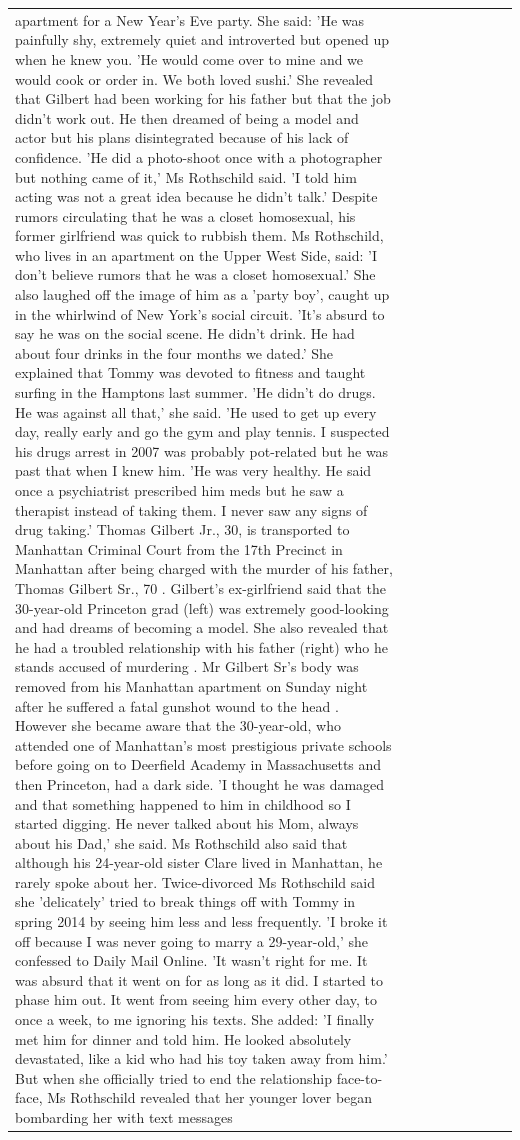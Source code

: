 \begin{table}[H]
\begin{tabular}{lllrlllll}
apartment for a New Year’s Eve party. She said: 'He was painfully shy, extremely quiet and introverted but opened up when he knew you. 'He would come over to mine and we would cook or order in. We both loved sushi.' She revealed that Gilbert had been working for his father but that the job didn't work out. He then dreamed of being a model and actor but his plans disintegrated because of his lack of confidence. 'He did a photo-shoot once with a photographer but nothing came of it,' Ms Rothschild said. 'I told him acting was not a great idea because he didn’t talk.' Despite rumors circulating that he was a closet homosexual, his former girlfriend was quick to rubbish them. Ms Rothschild, who lives in an apartment on the Upper West Side, said: 'I don’t believe rumors that he was a closet homosexual.' She also laughed off the image of him as a 'party boy', caught up in the whirlwind of New York's social circuit. 'It’s absurd to say he was on the social scene. He didn’t drink. He had about four drinks in the four months we dated.' She explained that Tommy was devoted to fitness and taught surfing in the Hamptons last summer. 'He didn’t do drugs. He was against all that,' she said. 'He used to get up every day, really early and go the gym and play tennis. I suspected his drugs arrest in 2007 was probably pot-related but he was past that when I knew him. 'He was very healthy. He said once a psychiatrist prescribed him meds but he saw a therapist instead of taking them. I never saw any signs of drug taking.' Thomas Gilbert Jr., 30, is transported to Manhattan Criminal Court from the 17th Precinct in Manhattan after being charged with the murder of his father, Thomas Gilbert Sr., 70 . Gilbert's ex-girlfriend said that the 30-year-old Princeton grad (left) was extremely good-looking and had dreams of becoming a model. She also revealed that he had a troubled relationship with his father (right) who he stands accused of murdering . Mr Gilbert Sr's body was removed from his Manhattan apartment on Sunday night after he suffered a fatal gunshot wound to the head . However she became aware that the 30-year-old, who attended one of Manhattan's most prestigious private schools before going on to Deerfield Academy in Massachusetts and then Princeton, had a dark side. 'I thought he was damaged and that something happened to him in childhood so I started digging. He never talked about his Mom, always about his Dad,' she said. Ms Rothschild also said that although his 24-year-old sister Clare lived in Manhattan, he rarely spoke about her. Twice-divorced Ms Rothschild said she 'delicately' tried to break things off with Tommy in spring 2014 by seeing him less and less frequently. 'I broke it off because I was never going to marry a 29-year-old,' she confessed to Daily Mail Online. 'It wasn’t right for me. It was absurd that it went on for as long as it did. I started to phase him out. It went from seeing him every other day, to once a week, to me ignoring his texts. She added: 'I finally met him for dinner and told him. He looked absolutely devastated, like a kid who had his toy taken away from him.' But when she officially tried to end the relationship face-to-face, Ms Rothschild revealed that her younger lover began bombarding her with text messages 
\end{tabular}
\end{table}
